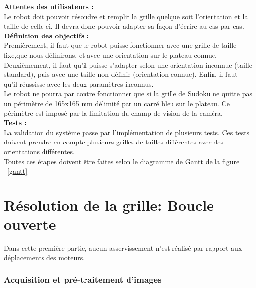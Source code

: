 \documentclass[11pt]{article}
\begin{document}
\textbf{Attentes des utilisateurs :}\\
Le robot doit pouvoir résoudre et remplir la grille quelque soit l'orientation et la taille de celle-ci. Il devra donc pouvoir adapter sa façon d'écrire au cas par cas.\\

\textbf{Définition des objectifs :}\\
Premièrement, il faut que le robot puisse fonctionner avec une grille de taille fixe,que nous définirons, et avec une orientation sur le plateau connue.\\
Deuxièmement, il faut qu'il puisse s'adapter selon une orientation inconnue (taille standard), puis avec une taille non définie (orientation connue). Enfin, il faut qu'il réussisse avec les deux paramètres inconnus.\\
Le robot ne pourra par contre fonctionner que si la grille de Sudoku ne quitte pas un périmètre de 165x165 mm délimité par un carré bleu sur le plateau. Ce périmètre est imposé par la limitation du champ de vision de la caméra.\\

\textbf{Tests :}\\
La validation du système passe par l'implémentation de plusieurs tests. Ces tests doivent prendre en compte plusieurs grilles de tailles différentes avec des orientations différentes.\\
Toutes ces étapes doivent être faites selon le diagramme de Gantt de la figure ~\ref{gantt}

\part{Résolution de la grille: Boucle ouverte}
Dans cette première partie, aucun asservissement n'est réalisé par rapport aux déplacements des moteurs.
\section{Acquisition et pré-traitement d'images}
\end{document}
